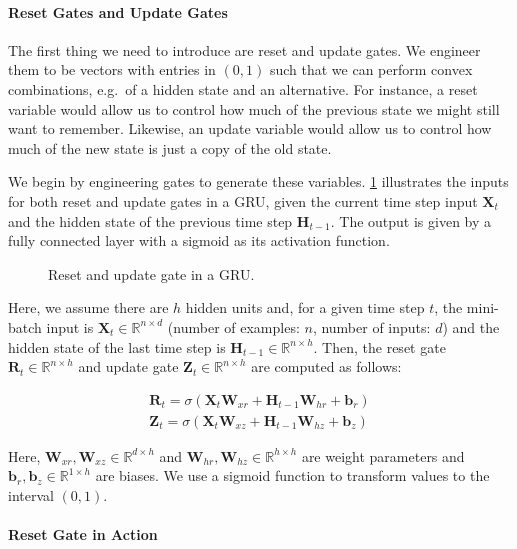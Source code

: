 \paragraph{Reset Gates and Update Gates}

The first thing we need to introduce are reset and update gates. We engineer them to be vectors with entries in $(0,1)$ such that we can perform convex combinations, e.g.\ of a hidden state and an alternative. For instance, a reset variable would allow us to control how much of the previous state we might still want to remember. Likewise, an update variable would allow us to control how much of the new state is just a copy of the old state.

We begin by engineering gates to generate these variables. \cref{fig:gru_1} illustrates the inputs for both reset and update gates in a GRU, given the current time step input $\mathbf{X}_t$ and the hidden state of the previous time step $\mathbf{H}_{t-1}$. The output is given by a fully connected layer with a sigmoid as its activation function.

\begin{figure}[hpt]
	\centering
	
	\caption{Reset and update gate in a GRU.}
	\label{fig:gru_1}
\end{figure}

Here, we assume there are $h$ hidden units and, for a given time step $t$, the mini-batch input is $\mathbf{X}_t \in \mathbb{R}^{n \times d}$ (number of examples: $n$, number of inputs: $d$) and the hidden state of the last time step is $\mathbf{H}_{t-1} \in \mathbb{R}^{n \times h}$. Then, the reset gate $\mathbf{R}_t \in \mathbb{R}^{n \times h}$ and update gate $\mathbf{Z}_t \in \mathbb{R}^{n \times h}$ are computed as follows:

$$
\begin{aligned}
\mathbf{R}_t = \sigma(\mathbf{X}_t \mathbf{W}_{xr} + \mathbf{H}_{t-1} \mathbf{W}_{hr} + \mathbf{b}_r)\\
\mathbf{Z}_t = \sigma(\mathbf{X}_t \mathbf{W}_{xz} + \mathbf{H}_{t-1} \mathbf{W}_{hz} + \mathbf{b}_z)
\end{aligned}
$$

Here, $\mathbf{W}_{xr}, \mathbf{W}_{xz} \in \mathbb{R}^{d \times h}$ and $\mathbf{W}_{hr}, \mathbf{W}_{hz} \in \mathbb{R}^{h \times h}$ are weight parameters and $\mathbf{b}_r, \mathbf{b}_z \in \mathbb{R}^{1 \times h}$ are biases. We use a sigmoid function to transform values to the interval $(0,1)$.

\paragraph{Reset Gate in Action}

